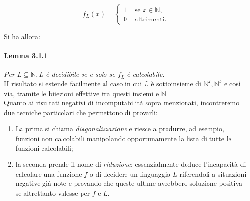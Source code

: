 $$
    f_L(x)= \begin{cases}1 & \text { se } x \in \mathbb{N}, \\ 0 & \text { altrimenti. }\end{cases}
$$

Si ha allora:

\paragraph{Lemma 3.1.1} \textit{Per $L \subseteq \mathbb{N}, L$ è decidibile se e solo se
    $f_L$ è calcolabile.}\\

II risultato si estende facilmente al
caso in cui $L$ è sottoinsieme di $\mathbb{N}^2, \mathbb{N}^3$ e così via, tramite le
biiezioni effettive tra questi insiemi e $\mathbb{N}$.\\
Quanto ai risultati negativi
di incomputabilità sopra menzionati, incontreremo due tecniche particolari che
permettono di provarli:

\begin{enumerate}
    \item La prima si chiama \textit{diagonalizzazione} e riesce a produrre,
          ad esempio, funzioni non calcolabili manipolando opportunamente la lista di tutte le
          funzioni calcolabili;
    \item la seconda prende il nome di \textit{riduzione}: essenzialmente
          deduce l'incapacità di calcolare una funzione $f$ o di decidere un linguaggio $L$
          riferendoli a situazioni negative già note e provando che queste ultime avrebbero
          soluzione positiva se altrettanto valesse per $f$ e $L$.
\end{enumerate}